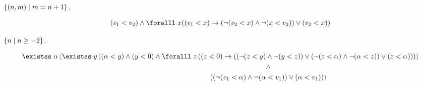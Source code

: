 \begin{problem}
\begin{enumalph}
\begin{Answer}
      \end{Answer}
    \item $\left\{ (n,m) \mid m = n +  1\right\}$.
      \begin{Answer}
        \begin{align*}
          (v_1 < v_2) \land
            \forall x ((v_1 < x) \lto (\lnot (v_2 < x) \land \lnot (x < v_2)) \lor (v_2 < x))
        \end{align*}
      \end{Answer}
    \item $\left\{n \mid n \geq -2\right\}$.
      \begin{Answer}
        \begin{align*}
          \exists \alpha\, \green{(}
            \exists y\, \crim{(}
              (\alpha < y) \land (y < 0)
              \land
              \forall z\, (
                (z < 0) \lto 
                (
                  (\lnot (z < y) &\land \lnot (y < z)) \lor 
                  (\lnot (z < \alpha) \land \lnot (\alpha < z)) \lor 
                  (z < \alpha)
                )
              )
            \crim{)}
            \\ &\land \\ 
            ((\lnot (v_1 < \alpha) \land \lnot (\alpha &< v_1)) \lor (\alpha < v_1))
          \green{)}
        \end{align*}
      \end{Answer}
  \end{enumalph}
\end{problem}
